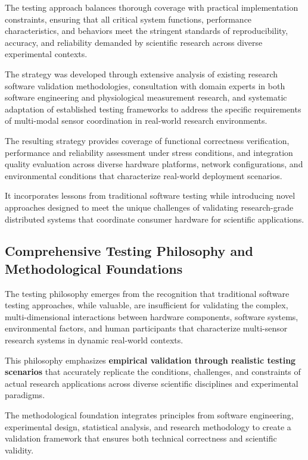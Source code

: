 The testing approach balances thorough coverage with practical implementation constraints, ensuring that all critical system functions, performance characteristics, and behaviors meet the stringent standards of reproducibility, accuracy, and reliability demanded by scientific research across diverse experimental contexts.

The strategy was developed through extensive analysis of existing research software validation methodologies, consultation with domain experts in both software engineering and physiological measurement research, and systematic adaptation of established testing frameworks to address the specific requirements of multi-modal sensor coordination in real-world research environments.

The resulting strategy provides coverage of functional correctness verification, performance and reliability assessment under stress conditions, and integration quality evaluation across diverse hardware platforms, network configurations, and environmental conditions that characterize real-world deployment scenarios.

It incorporates lessons from traditional software testing while introducing novel approaches designed to meet the unique challenges of validating research-grade distributed systems that coordinate consumer hardware for scientific applications.

\subsection{Comprehensive Testing Philosophy and Methodological Foundations}

The testing philosophy emerges from the recognition that traditional software testing approaches, while valuable, are insufficient for validating the complex, multi-dimensional interactions between hardware components, software systems, environmental factors, and human participants that characterize multi-sensor research systems in dynamic real-world contexts.

This philosophy emphasizes \textbf{empirical validation through realistic testing scenarios}
 that accurately replicate the conditions, challenges, and constraints of actual research applications across diverse scientific disciplines and experimental paradigms.

The methodological foundation integrates principles from software engineering, experimental design, statistical analysis, and research methodology to create a validation framework that ensures both technical correctness and scientific validity.

